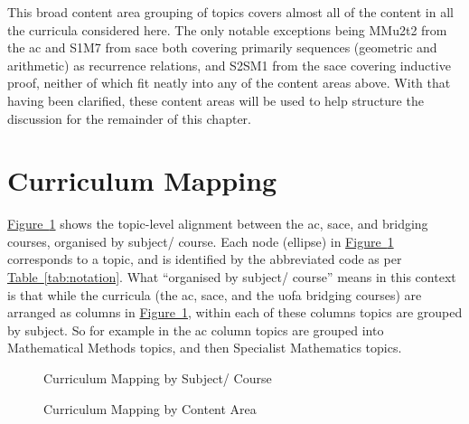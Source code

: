 \documentclass[twoside,12pt,a4paper]{report}
\newcommand{\reffig}[1]{\hyperref[fig:#1]{Figure~\ref{fig:#1}}}
\newcommand{\reftab}[1]{\hyperref[tab:#1]{Table~\ref{tab:#1}}}
\begin{document}
This broad content area grouping of topics covers almost all of the content in all the curricula considered here. The only notable exceptions being MMu2t2 from the \gls{ac} and S1M7 from \gls{sace} both covering primarily sequences (geometric and arithmetic) as recurrence relations, and S2SM1 from the \gls{sace} covering inductive proof, neither of which fit neatly into any of the content areas above. With that having been clarified, these content areas will be used to help structure the discussion for the remainder of this chapter.








\section{Curriculum Mapping}
\label{sec:mapping}

\reffig{mapping} shows the topic-level alignment between the \gls{ac}, \gls{sace}, and bridging courses, organised by subject/ course. Each node (ellipse) in \reffig{mapping} corresponds to a topic, and is identified by the abbreviated code as per \reftab{notation}. What ``organised by subject/ course'' means in this context is that while the curricula (the \gls{ac}, \gls{sace}, and the \gls{uofa} bridging courses) are arranged as columns in \reffig{mapping}, within each of these columns topics are grouped by subject. So for example in the \gls{ac} column topics are grouped into Mathematical Methods topics, and then Specialist Mathematics topics.

\clearpage

\pagestyle{empty}

\begin{figure}[p]
\begin{center}

\caption{Curriculum Mapping by Subject/ Course\label{fig:mapping}}
\end{center}
\end{figure}

\begin{figure}[p]
\begin{center}

\caption{Curriculum Mapping by Content Area\label{fig:mappingByTopic}}
\end{center}
\end{figure}

\clearpage

\pagestyle{plain}
\end{document}
